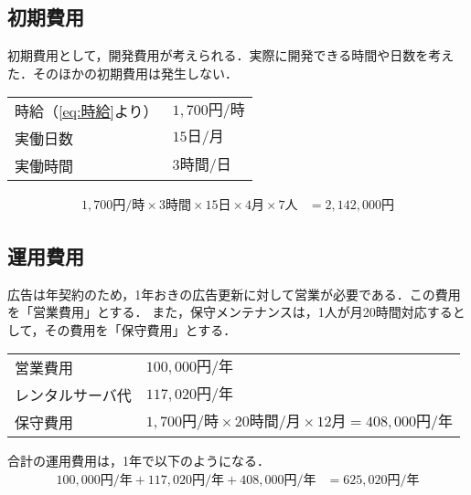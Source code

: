 \subsection{初期費用}
初期費用として，開発費用が考えられる．実際に開発できる時間や日数を考えた．そのほかの初期費用は発生しない．
\begin{framed}
    \begin{tabular}{ll}
        時給（\eqref{eq:時給}より） & \(1,700\text{円/時}\) \\
        実働日数                & \(15\text{日/月}\)    \\
        実働時間                & \(3\text{時間/日}\)
    \end{tabular}
\end{framed}
\begin{equation}
    \begin{aligned}
        1,700{円/時}\times 3\text{時間}\times 15\text{日}\times 4\text{月}\times 7\text{人} & = 2,142,000\text{円}\label{eq:開発費用}
    \end{aligned}
\end{equation}
\subsection{運用費用}
広告は年契約のため，1年おきの広告更新に対して営業が必要である．この費用を「営業費用」とする．
また，保守メンテナンスは，1人が月20時間対応するとして，その費用を「保守費用」とする．
\begin{framed}
    \begin{tabular}{ll}
        営業費用     & \(100,000\text{円/年}\)                                                      \\
        レンタルサーバ代 & \(117,020\text{円/年}\)                                                      \\
        保守費用     & \(1,700\text{円/時}\times 20\text{時間/月}\times 12\text{月}=408,000\text{円/年}\) \\
    \end{tabular}
\end{framed}
合計の運用費用は，1年で以下のようになる．
\begin{equation}
    \begin{aligned}
        100,000\text{円/年}+117,020\text{円/年}+408,000\text{円/年} & =625,020\text{円/年}\label{eq:運用費用}
    \end{aligned}
\end{equation}
